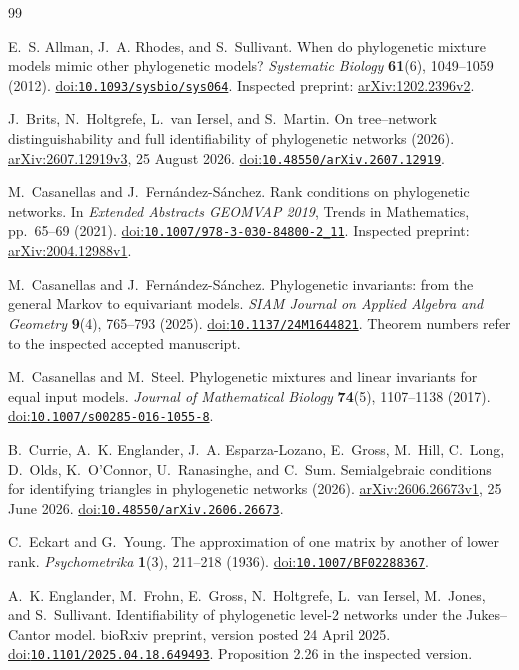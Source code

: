 \documentclass[11pt]{article}
\theoremstyle{definition}
\theoremstyle{remark}
\newcommand{\doi}[1]{\href{https://doi.org/#1}{doi:\nolinkurl{#1}}}
\begin{document}
\begin{thebibliography}{99}

E.~S. Allman, J.~A. Rhodes, and S.~Sullivant.
When do phylogenetic mixture models mimic other phylogenetic models?
\emph{Systematic Biology} \textbf{61}(6), 1049--1059 (2012).
\doi{10.1093/sysbio/sys064}.
Inspected preprint: \href{https://arxiv.org/abs/1202.2396v2}{arXiv:1202.2396v2}.

J.~Brits, N.~Holtgrefe, L.~van Iersel, and S.~Martin.
On tree--network distinguishability and full identifiability of
phylogenetic networks (2026).
\href{https://arxiv.org/abs/2607.12919v3}{arXiv:2607.12919v3}, 25 August 2026.
\doi{10.48550/arXiv.2607.12919}.

M.~Casanellas and J.~Fern\'andez-S\'anchez.
Rank conditions on phylogenetic networks.
In \emph{Extended Abstracts GEOMVAP 2019}, Trends in Mathematics,
pp.~65--69 (2021). \doi{10.1007/978-3-030-84800-2_11}.
Inspected preprint: \href{https://arxiv.org/abs/2004.12988v1}{arXiv:2004.12988v1}.

M.~Casanellas and J.~Fern\'andez-S\'anchez.
Phylogenetic invariants: from the general Markov to equivariant models.
\emph{SIAM Journal on Applied Algebra and Geometry} \textbf{9}(4),
765--793 (2025). \doi{10.1137/24M1644821}.
Theorem numbers refer to the inspected accepted manuscript.

M.~Casanellas and M.~Steel.
Phylogenetic mixtures and linear invariants for equal input models.
\emph{Journal of Mathematical Biology} \textbf{74}(5), 1107--1138 (2017).
\doi{10.1007/s00285-016-1055-8}.

B.~Currie, A.~K. Englander, J.~A. Esparza-Lozano, E.~Gross, M.~Hill,
C.~Long, D.~Olds, K.~O'Connor, U.~Ranasinghe, and C.~Sum.
Semialgebraic conditions for identifying triangles in phylogenetic networks
(2026). \href{https://arxiv.org/abs/2606.26673v1}{arXiv:2606.26673v1},
25 June 2026. \doi{10.48550/arXiv.2606.26673}.

C.~Eckart and G.~Young.
The approximation of one matrix by another of lower rank.
\emph{Psychometrika} \textbf{1}(3), 211--218 (1936).
\doi{10.1007/BF02288367}.

A.~K. Englander, M.~Frohn, E.~Gross, N.~Holtgrefe, L.~van Iersel,
M.~Jones, and S.~Sullivant.
Identifiability of phylogenetic level-2 networks under the Jukes--Cantor model.
bioRxiv preprint, version posted 24 April 2025.
\doi{10.1101/2025.04.18.649493}.
Proposition 2.26 in the inspected version.


\end{thebibliography}
\end{document}
